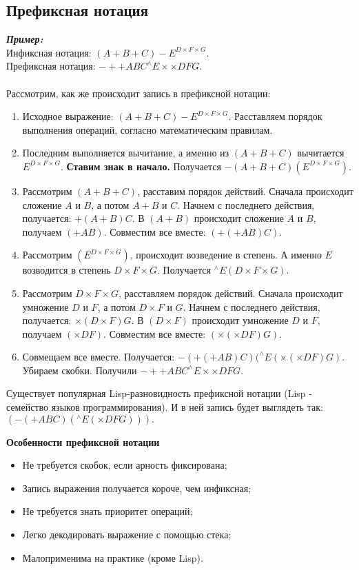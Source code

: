 \subsection{Префиксная нотация}
\textbf{\emph{Пример:}}
\\Инфиксная нотация: $(A + B + C) - E^{D\times F\times G}.$
\\Префиксная нотация: $-++ABC^{\wedge}E\times\times DFG.$
\\
\\Рассмотрим, как же происходит запись в префиксной нотации:
\begin{enumerate}
 \item Исходное выражение: $(A + B + C) - E^{D\times F\times G}$. Расставляем порядок выполнения операций, согласно математическим правилам.
\item Последним выполняется вычитание, а именно из $(A + B + C)$ вычитается $E^{D\times F\times G}$. \textbf{Ставим знак в начало.} Получается $-(A + B + C)(E^{D\times F\times G})$.
\item Рассмотрим $(A + B + C)$, расставим порядок действий. Сначала происходит сложение $A$ и $B$, а потом $A+B$ и $C$. Начнем с последнего действия, получается: $+(A+B)C$. В $(A+B)$ происходит сложение $A$ и $B$, получаем $(+AB)$. Совместим все вместе: $(+(+AB)C)$.
\item Рассмотрим $(E^{D\times F\times G})$, происходит возведение в степень. А именно $E$ возводится в степень $D\times F\times G$. Получается $^{\wedge}E(D\times F\times G)$.
\item Рассмотрим $D\times F\times G$, расставляем порядок действий. Сначала происходит умножение $D$ и $F$, а потом $D\times F$ и $G$. Начнем с последнего действия, получается: $\times(D \times F)G$. В $(D \times F)$ происходит умножение $D$ и $F$, получаем $(\times DF)$. Совместим все вместе: $(\times(\times DF)G)$.
\item Совмещаем все вместе. Получается: $-(+(+AB)C)(^{\wedge}E(\times(\times DF)G)$. Убираем скобки. Получили $-++ABC^{\wedge}E\times\times DFG$.
\end{enumerate}
Существует популярная Lisp-разновидность префиксной нотации (Lisp - семейство языков программирования). И в ней запись будет выглядеть так: $(-(+ABC)(^{\wedge}E(\times DFG))).$
\begin{center}
  \textbf{Особенности префиксной нотации}
\end{center}
\begin{itemize}
  \item Не требуется скобок, если арность фиксирована;
  \item Запись выражения получается короче, чем инфиксная;
  \item Не требуется знать приоритет операций;
  \item Легко декодировать выражение с помощью стека;
  \item Малоприменима на практике (кроме Lisp).
\end{itemize}
